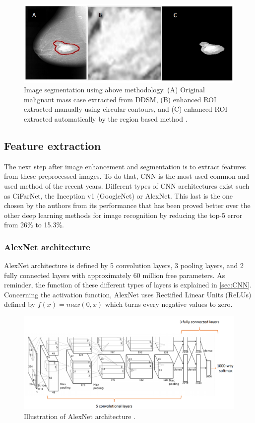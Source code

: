 \documentclass[11pt, openany]{report}
\theoremstyle{plain}
\theoremstyle{definition}
\theoremstyle{remark}
\begin{document}
\begin{figure}[h]
  \centering
  \includegraphics[scale=0.6]{figures/image-segmentation.png}
  \caption{Image segmentation using above methodology. (A) Original malignant mass case extracted from DDSM, (B) enhanced ROI extracted manually using circular contours, and (C) enhanced ROI extracted automatically by the region based method \cite{breast-cancer}.}
  \label{fig:image-segmentation}
\end{figure}


\subsection{Feature extraction}
The next step after image enhancement and segmentation is to extract features from these preprocessed images. To do that, CNN is the most used common and used method of the recent years. Different types of CNN architectures exist such as CiFarNet, the Inception v1 (GoogleNet) or AlexNet. This last is the one chosen by the authors from its performance that has been proved better over the other deep learning methods for image recognition by reducing the top-5 error from 26\% to 15.3\%. 

\subsubsection{AlexNet architecture}
AlexNet architecture is defined by 5 convolution layers, 3 pooling layers, and 2 fully connected layers with approximately 60 million free parameters. As reminder, the function of these different types of layers is explained in \autoref{sec:CNN}. Concerning the activation function, AlexNet uses Rectified Linear Units (ReLUs) defined by $f(x) = max(0, x)$ which turns every negative values to zero. 

\begin{figure}[h]
  \centering
  \includegraphics[scale=0.47]{figures/AlexNet.png}
  \caption{Illustration of AlexNet architecture \cite{AlexNet}.}
  \label{fig:image-segmentation}
\end{figure}
\end{document}
